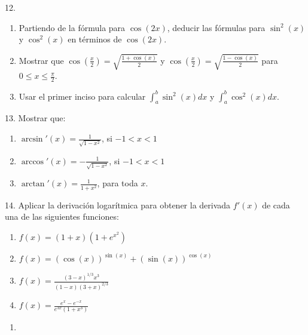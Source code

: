 \documentclass[12pt]{article}
\begin{document}
12. 
\begin{enumerate}[\hspace{9px} a)]
    \item Partiendo de la f\'ormula para $\cos(2x)$, deducir las f\'ormulas para $\sin^2(x)$ y $\cos^2(x)$ en t\'erminos de $\cos(2x)$.
    
    \item Mostrar que \(\cos\left(\displaystyle\frac{x}{2}\right)=\sqrt{\frac{1+\cos(x)}{2}}\) y \(\cos\left(\displaystyle\frac{x}{2}\right)=\sqrt{\frac{1-\cos(x)}{2}}\) para \(0 \leq x \leq \displaystyle\frac{\pi}{2}\).
    
    \item Usar el primer inciso para calcular \(\displaystyle\int_{a}^{b}\sin^2(x)dx\) y \(\displaystyle\int_{a}^{b}\cos^2(x)dx\).

\end{enumerate}

13. Mostrar que:

\begin{enumerate}[\hspace{9px} a)]
    \item \(\arcsin'(x)=\displaystyle\frac{1}{\sqrt{1-x^2}}\), si \(-1<x<1\)
    
    \item \(\arccos'(x)=\displaystyle-\frac{1}{\sqrt{1-x^2}}\), si \(-1<x<1\)
    
    \item \(\arctan'(x)=\displaystyle\frac{1}{1+x^2}\), para toda $x$.

\end{enumerate}

14. Aplicar la derivaci\'on logar\'itmica para obtener la derivada $f'(x)$ de cada una de las siguientes funciones:

\begin{enumerate}[\hspace{9px} a)]
    \item \(f(x)=(1+x)(1+e^{x^2})\)
    
    \item \(f(x)=(\cos(x))^{\sin(x)}+(\sin(x))^{\cos(x)}\)
    
    \item \(f(x)=\displaystyle\frac{(3-x)^{1/3}x^3}{(1-x)(3+x)^{2/3}}\)
    
    \item \(f(x)=\displaystyle\frac{e^x-e^{-x}}{e^{3x}(1+x^3)}\)
    
\end{enumerate}


\begin{enumerate}[\hspace{9px} a)]

    \item 

\end{enumerate}
\end{document}
